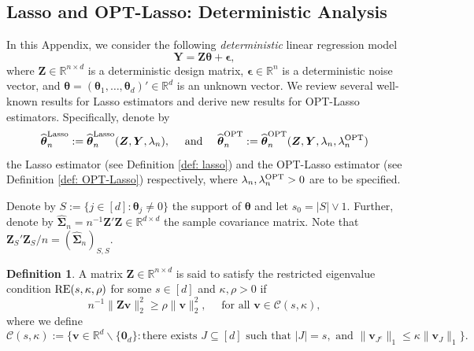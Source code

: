 \documentclass[aos,preprint]{imsart}
\theoremstyle{plain}
\theoremstyle{definition}
\newtheorem{definition}{Definition}
\newcommand{\btheta}{\boldsymbol{\theta}}
\newcommand{\bd}[1]{\boldsymbol{#1}}
\newcommand{\hbtheta}{\widehat{\boldsymbol{\theta}}}
\newcommand{\mR}{\mathbb{R}}
\newcommand{\ltheta}{\hbtheta^{\textup{Lasso}}}
\newcommand{\ptheta}{\widehat{\boldsymbol{\theta}}^{\textup{OPT}}}
\newcommand{\bY}{\boldsymbol{Y}}
\newcommand{\hdlambda}{\lambda^{\textup{OPT}}}
\newcommand{\bv}{\boldsymbol{v}}
\newcommand{\bZ}{\boldsymbol{Z}}
\newcommand{\pS}{\hat{S}^{\textup{OPT}}}
\newcommand{\hbSigma}{\hat{\boldsymbol{\Sigma}}}
\newcommand{\bepsilon}{\bd{\epsilon}}
\newcommand{\bR}{\mathbb{R}}
\begin{document}
\begin{appendix}

\section{Lasso and OPT-Lasso: Deterministic Analysis}
\label{app:lasso_deterministic_analysis}
In this Appendix, we consider the following \textit{deterministic} linear regression model 
$$\bY = \bZ\btheta +\bepsilon,$$ 
where $\bZ \in \mR^{n\times d}$ is a deterministic design matrix, $\bepsilon\in \mR^n$ is a deterministic noise vector, and $\btheta = (\btheta_1,\ldots,\btheta_d)' \in \bR^{d}$ is an unknown vector. We review several well-known results for Lasso estimators and derive new results for OPT-Lasso estimators. Specifically, denote by 
$$\ltheta_n:=\ltheta_n(\bZ,\bY,\lambda_n),\quad
\text{ and } \quad
\ptheta_n := \ptheta_n(\bZ,\bY,\lambda_n,\hdlambda_n)
$$ 
the Lasso estimator (see Definition \ref{def: lasso}) and the OPT-Lasso estimator (see Definition \ref{def: OPT-Lasso}) respectively,
where $\lambda_n, \hdlambda_n > 0$ are to be specified.





Denote by $S := \{j \in [d]: \btheta_j \neq 0\}$ the support of $\btheta$ and let $s_0 = |S| \vee 1$. Further, denote by $\hbSigma_n = n^{-1}\bZ'\bZ \in \bR^{d\times d}$ the sample covariance matrix. Note that   $\bZ_S'\bZ_S/n = (\hbSigma_n)_{S,S}$. 


\begin{definition} \label{def: RE}
A matrix $\bZ\in \mR^{n\times d}$ is said to satisfy the restricted eigenvalue condition $\textup{RE}(s,\kappa,\rho)$ for some $s \in [d]$ and $\kappa, \rho > 0$ if 
$$n^{-1}\|\bZ \bv\|_2^2 \ge \rho\|\bv\|_2^2, \quad \text{ for all } \bv\in \mathcal{C}(s,\kappa),
$$
where we define
$$
\mathcal{C}(s,\kappa):=\{\bv\in \mR^d \backslash \{\bd{0}_d\}: \text{there exists } J\subseteq [d] \text{ such that } |J| = s, \text{ and } \|\bv_{J^c}\|_1 \le \kappa\|\bv_J\|_1\}.
$$
\end{definition}


\end{appendix}
\end{document}
